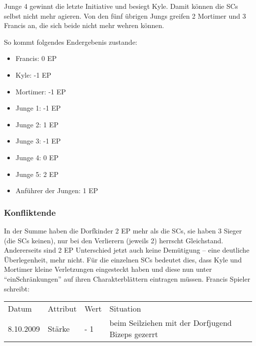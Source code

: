 Junge 4 gewinnt die letzte Initiative und besiegt Kyle. Damit können die SCs selbst nicht mehr agieren. Von den fünf übrigen Jungs greifen 2 Mortimer und 3 Francis an, die sich beide nicht mehr wehren können.

So kommt folgendes Endergebenis zustande:
\begin {itemize}
\item Francis: 0 EP
\item Kyle: -1 EP
\item Mortimer: -1 EP
\item Junge 1: -1 EP
\item Junge 2: 1 EP
\item Junge 3: -1 EP
\item Junge 4: 0 EP
\item Junge 5: 2 EP
\item Anführer der Jungen: 1 EP
\end {itemize}

\subsubsection{Konfliktende}

In der Summe haben die Dorfkinder 2 EP mehr als die SCs, sie haben 3 Sieger (die SCs keinen), nur bei den Verlierern (jeweils 2) herrscht Gleichstand. Andererseits sind 2 EP Unterschied jetzt auch keine Demütigung -- eine deutliche Überlegenheit, mehr nicht.
Für die einzelnen SCs bedeutet dies, dass Kyle und Mortimer kleine Verletzungen eingesteckt haben und diese nun unter "`einSchränkungen"' auf ihren Charakterblättern eintragen müssen. Francis Spieler schreibt:

\begin{table}[H]
\begin{tabular}{|l|l|l|l|}
\hline
Datum & Attribut & Wert & Situation\\
8.10.2009 & Stärke & - 1 & beim Seilziehen mit der Dorfjugend Bizeps gezerrt\\
\hline
\end{tabular}
\end{table}

